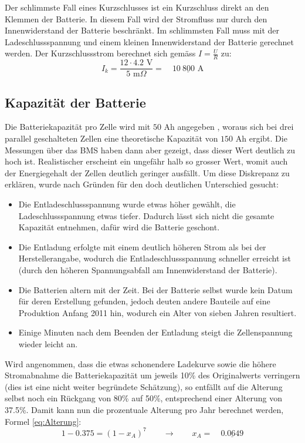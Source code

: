 Der schlimmste Fall eines Kurzschlusses ist ein Kurzschluss direkt an den Klemmen der Batterie. In diesem Fall wird der Stromfluss nur durch den Innenwiderstand der Batterie beschränkt. Im schlimmsten Fall muss mit der Ladeschlussspannung und einem kleinen Innenwiderstand der Batterie gerechnet werden. Der Kurzschlussstrom berechnet sich gemäss $I=\frac{U}{R}$ zu:
\begin{equation*}
	I_k=\frac{12\cdot 4.2\text{ V}}{5\text{ m}\Omega}=\quad\underline{10\ 800\text{ A}}
\end{equation*}

\subsection{Kapazität der Batterie}\label{sec:ah}
\color{blue}Die Batteriekapazität pro Zelle wird mit $50$ Ah angegeben \cite{lev50}, woraus sich bei drei parallel geschalteten Zellen eine theoretische Kapazität von $150$ Ah ergibt. Die Messungen über das BMS haben dann aber gezeigt, dass dieser Wert deutlich zu hoch ist. Realistischer erscheint ein ungefähr halb so grosser Wert, womit auch der Energiegehalt der Zellen deutlich geringer ausfällt. Um diese Diskrepanz zu erklären, wurde nach Gründen für den doch deutlichen Unterschied gesucht: \begin{itemize}
	\item Die Entladeschlussspannung wurde etwas höher gewählt, die Ladeschlussspannung etwas tiefer. Dadurch lässt sich nicht die gesamte Kapazität entnehmen, dafür wird die Batterie geschont.
	\item Die Entladung erfolgte mit einem deutlich höheren Strom als bei der Herstellerangabe, wodurch die Entladeschlussspannung schneller erreicht ist (durch den höheren Spannungsabfall am Innenwiderstand der Batterie).
	\item Die Batterien altern mit der Zeit. Bei der Batterie selbst wurde kein Datum für deren Erstellung gefunden, jedoch deuten andere Bauteile auf eine Produktion Anfang 2011 hin, wodurch ein Alter von sieben Jahren resultiert.
	\item Einige Minuten nach dem Beenden der Entladung steigt die Zellenspannung wieder leicht an.
\end{itemize}

Wird angenommen, dass die etwas schonendere Ladekurve sowie die höhere Stromabnahme die Batteriekapazität um jeweils 10\% des Originalwerts verringern (dies ist eine nicht weiter begründete Schätzung), so entfällt auf die Alterung selbst noch ein Rückgang von 80\% auf 50\%, entsprechend einer Alterung von 37.5\%. Damit kann nun die prozentuale Alterung pro Jahr berechnet werden, Formel \ref{eq:Alterung}:
\begin{equation}
	1-0.375=\left(1-x_A\right)^7\qquad\rightarrow\qquad x_A=\quad\underline{0.0649}
\label{eq:Alterung}
\end{equation}

